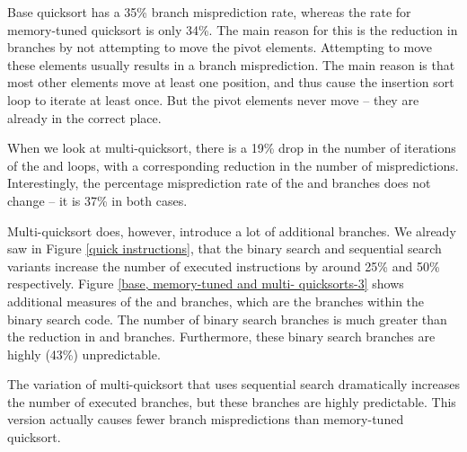 Base quicksort has a 35\% branch misprediction rate, whereas the rate for
memory-tuned quicksort is only 34\%. The main reason for this is the reduction
in branches by not attempting to move the pivot elements.  Attempting to move
these elements usually results in a branch misprediction. The main reason is
that most other elements move at least one position, and thus cause the
insertion sort loop to iterate at least once. But the pivot elements never move
-- they are already in the correct place.

When we look at multi-quicksort, there is a 19\% drop in the number of
iterations of the  and  loops, with a corresponding reduction in the
number of mispredictions. Interestingly, the percentage misprediction rate of
the  and  branches does not change -- it is 37\% in both cases.



Multi-quicksort does, however, introduce a lot of additional branches. We
already saw in Figure \ref{quick instructions}, that the binary search and
sequential search variants increase the number of executed instructions by
around 25\% and 50\% respectively. Figure \ref{base, memory-tuned and multi-
quicksorts-3} shows additional measures of the  and  branches, which are the branches within the binary search code. The
number of binary search branches is much greater than the reduction in 
and  branches. Furthermore, these binary search branches are highly (43\%)
unpredictable.

The variation of multi-quicksort that uses sequential search dramatically
increases the number of executed branches, but these branches are highly
predictable. This version actually causes fewer branch mispredictions than
memory-tuned quicksort.


